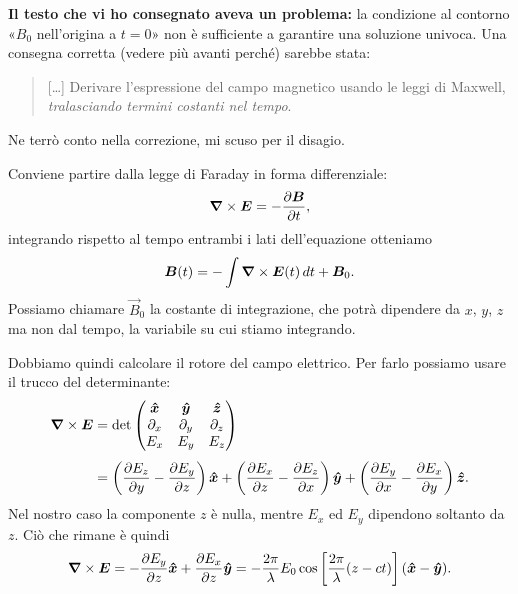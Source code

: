 \documentclass[10pt]{gulartcl}
\begin{document}
\begin{solution}
\textbf{Il testo che vi ho consegnato aveva un problema:} la
condizione al contorno «$B_0$ nell’origina a $t = 0$» non è sufficiente a
garantire una soluzione univoca. Una consegna corretta (vedere più avanti
perché) sarebbe stata:
\begin{quote}
    […] Derivare l’espressione del campo magnetico usando le leggi di
    Maxwell, \emph{tralasciando termini costanti nel tempo}.
\end{quote}
Ne terrò conto nella correzione, mi scuso per il
disagio.

Conviene partire dalla legge di Faraday in forma differenziale:
\begin{equation}
    \curl{E} = -\pdiff{\vec{B}}{t},
\end{equation}
integrando rispetto al tempo entrambi i lati dell’equazione otteniamo
\begin{equation}
    \bm{B}(t) = -\int \bm{\nabla}\times\bm{E}(t) \, dt + \bm{B}_0.
    \label{eq:B(t)-final}
\end{equation}
Possiamo chiamare $\vec{B}_0$ la costante di integrazione, che potrà
dipendere da $x$, $y$, $z$ ma non dal tempo, la variabile su cui stiamo
integrando.

Dobbiamo quindi calcolare il rotore del campo elettrico. Per farlo
possiamo usare il trucco del determinante:
\begin{equation}
\begin{split} 
    \curl{E} &= \det
    \begin{pmatrix}
        \uvec{x} & \uvec{y} & \uvec{z} \\
        \partial_x & \partial_y & \partial_z \\
        E_x & E_y & E_z
    \end{pmatrix} \\[0.25\baselineskip]
             &= \left(\pdiff{E_z}{y} - \pdiff{E_y}{z}\right) \uvec{x}
              + \left(\pdiff{E_x}{z} - \pdiff{E_z}{x}\right) \uvec{y}
              + \left(\pdiff{E_y}{x} - \pdiff{E_x}{y}\right) \uvec{z}.
\end{split}
\end{equation}
Nel nostro caso la componente $z$ è nulla, mentre $E_x$ ed $E_y$ dipendono
soltanto da $z$. Ciò che rimane è quindi
\begin{equation}
    \curl{E} = -\pdiff{E_y}{z} \uvec{x} + \pdiff{E_x}{z} \uvec{y}
             = -\frac{2\pi}{\lambda} E_0
               \cos\left[\frac{2\pi}{\lambda}(z - ct)\right]
               (\uvec{x} - \uvec{y}).
\end{equation}


\end{solution}
\end{document}
